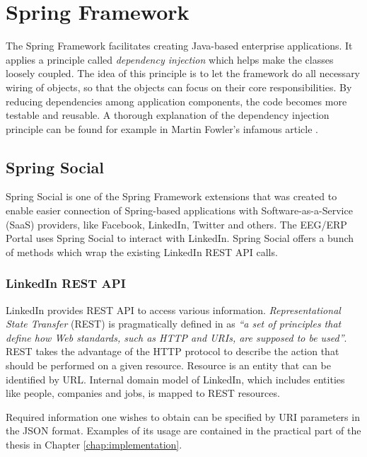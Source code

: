 \section{Spring Framework}

The Spring Framework \cite{SpringFramework:Home} facilitates creating Java-based enterprise applications. It applies a principle called \textit{dependency injection} which helps make the classes loosely coupled. The idea of this principle is to let the framework do all necessary wiring of objects, so that the objects can focus on their core responsibilities. By reducing dependencies among application components, the code becomes more testable and reusable. A thorough explanation of the dependency injection principle can be found for example in Martin Fowler's infamous article \cite{Fowler:DI}. 

\subsection{Spring Social}

Spring Social is one of the Spring Framework extensions that was created to enable easier connection of Spring-based applications with Software-as-a-Service (SaaS) providers, like Facebook, LinkedIn, Twitter and others.
The EEG/ERP Portal uses Spring Social to interact with LinkedIn. %
Spring Social offers a bunch of methods which wrap the existing LinkedIn REST API calls. %

\subsubsection{LinkedIn REST API} 
LinkedIn provides REST API to access various information. 
\textit{Representational State Transfer} (REST) is pragmatically defined in \cite{REST:Introduction} as \textit{``a set of principles that define how Web standards, such as HTTP and URIs, are supposed to be used''}.
REST takes the advantage of the HTTP protocol to describe the action that should be performed on a given resource.
Resource is an entity that can be identified by URL.
Internal domain model of LinkedIn, which includes entities like people, companies and jobs, is mapped to REST resources. 

Required information one wishes to obtain can be specified by URI parameters in the JSON format. Examples of its usage are contained in the practical part of the thesis in Chapter \ref{chap:implementation}.


